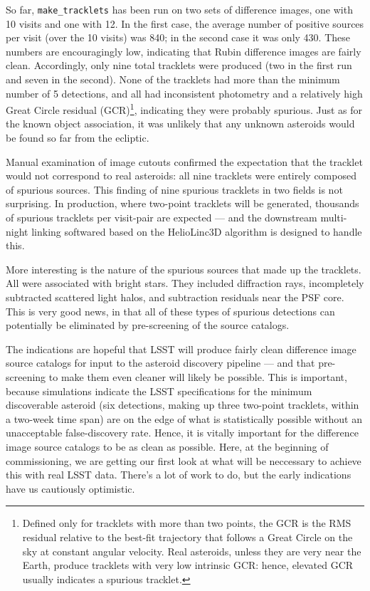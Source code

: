 So far, {\tt make\_tracklets} has been run on two sets of difference images,
one with 10 visits and one with 12.  In the first case, the average number
of positive sources per visit (over the 10 visits) was 840; in the second
case it was only 430.  These numbers are encouragingly low, indicating that
Rubin difference images are fairly clean.  Accordingly, only nine total
tracklets were produced (two in the first run and seven in the second). 
None of the tracklets had more than the minimum number of 5 detections, and
all had inconsistent photometry and a relatively high Great Circle residual
(GCR)\footnote{Defined only for tracklets with more than two points, the GCR
is the RMS residual relative to the best-fit trajectory that follows a Great
Circle on the sky at constant angular velocity.  Real asteroids, unless they
are very near the Earth, produce tracklets with very low intrinsic GCR:
hence, elevated GCR usually indicates a spurious tracklet.}, indicating they
were probably spurious.  Just as for the known object association, it was
unlikely that any unknown asteroids would be found so far from the ecliptic.

Manual examination of image cutouts confirmed the expectation that the
tracklet would not correspond to real asteroids: all nine tracklets were
entirely composed of spurious sources.  This finding of nine spurious
tracklets in two fields is not surprising.  In production, where two-point
tracklets will be generated, thousands of spurious tracklets per visit-pair
are expected --- and the downstream multi-night linking softwared based on
the HelioLinc3D algorithm is designed to handle this.

More interesting is the nature of the spurious sources that made up the
tracklets.  All were associated with bright stars.  They included
diffraction rays, incompletely subtracted scattered light halos, and
subtraction residuals near the PSF core.  This is very good news, in that
all of these types of spurious detections can potentially be eliminated by
pre-screening of the source catalogs.

The indications are hopeful that LSST will produce fairly clean difference
image source catalogs for input to the asteroid discovery pipeline --- and
that pre-screening to make them even cleaner will likely be possible.  This
is important, because simulations indicate the LSST specifications for the
minimum discoverable asteroid (six detections, making up three two-point
tracklets, within a two-week time span) are on the edge of what is
statistically possible without an unacceptable false-discovery rate.  Hence,
it is vitally important for the difference image source catalogs to be as
clean as possible.  Here, at the beginning of commissioning, we are getting
our first look at what will be neccessary to achieve this with real LSST
data.  There's a lot of work to do, but the early indications have us
cautiously optimistic.

